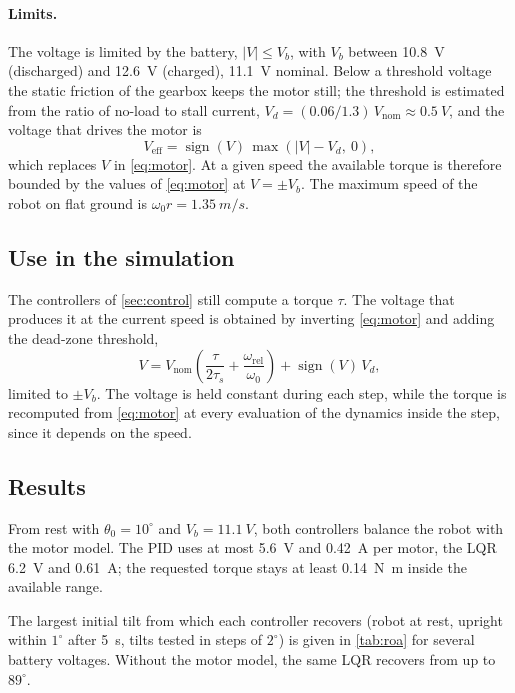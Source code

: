 \paragraph{Limits.} The voltage is limited by the battery,
$|V| \le V_b$, with $V_b$ between \SI{10.8}{V} (discharged) and \SI{12.6}{V}
(charged), \SI{11.1}{V} nominal. Below a threshold voltage the static friction
of the gearbox keeps the motor still; the threshold is estimated from the ratio
of no-load to stall current, $V_d = (0.06/1.3)\,V_{\mathrm{nom}} \approx \SI{0.5}{V}$,
and the voltage that drives the motor is
\begin{equation}
  V_{\mathrm{eff}} = \operatorname{sign}(V)\,\max\left(|V| - V_d,\ 0\right) ,
\end{equation}
which replaces $V$ in \cref{eq:motor}. At a given speed the available torque is
therefore bounded by the values of \cref{eq:motor} at $V = \pm V_b$. The maximum
speed of the robot on flat ground is $\omega_0 r = \SI{1.35}{m/s}$.

\subsection{Use in the simulation}

The controllers of \cref{sec:control} still compute a torque $\tau$. The
voltage that produces it at the current speed is obtained by inverting
\cref{eq:motor} and adding the dead-zone threshold,
\begin{equation}
  V = V_{\mathrm{nom}}\left(\frac{\tau}{2\tau_s} + \frac{\omega_{\mathrm{rel}}}{\omega_0}\right)
      + \operatorname{sign}(V)\,V_d ,
\end{equation}
limited to $\pm V_b$. The voltage is held constant during each step, while the
torque is recomputed from \cref{eq:motor} at every evaluation of the
dynamics inside the step, since it depends on the speed.

\subsection{Results}

From rest with $\theta_0 = 10^\circ$ and $V_b = \SI{11.1}{V}$, both controllers
balance the robot with the motor model. The PID uses at most \SI{5.6}{V} and
\SI{0.42}{A} per motor, the LQR \SI{6.2}{V} and \SI{0.61}{A}; the requested
torque stays at least \SI{0.14}{N.m} inside the available range.

The largest initial tilt from which each controller recovers (robot at rest,
upright within $1^\circ$ after \SI{5}{s}, tilts tested in steps of $2^\circ$)
is given in \cref{tab:roa} for several battery voltages. Without the motor
model, the same LQR recovers from up to $89^\circ$.

